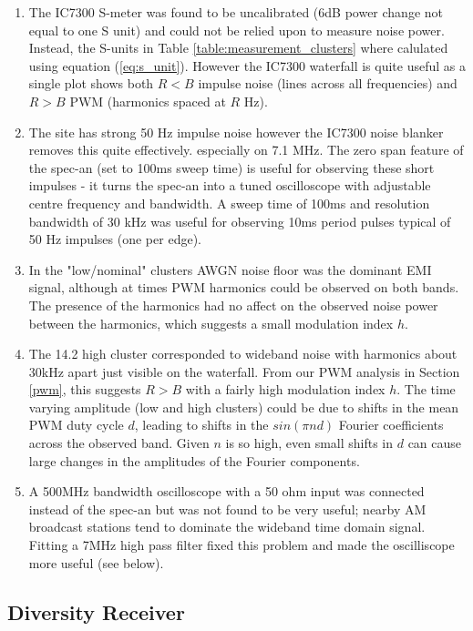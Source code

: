 \documentclass{article}
\begin{document}
\begin{enumerate}
\item The IC7300 S-meter was found to be uncalibrated \cite{vu2nsb_s_meter} (6dB power change not equal to one S unit) and could not be relied upon to measure noise power.  Instead, the S-units in Table \ref{table:measurement_clusters} where calulated using equation (\ref{eq:s_unit}). However the IC7300 waterfall is quite useful as a single plot shows both $R<B$ impulse noise (lines across all frequencies) and $R>B$ PWM (harmonics spaced at $R$ Hz).
\item The site has strong 50 Hz impulse noise however the IC7300 noise blanker removes this quite effectively. especially on 7.1 MHz.  The zero span feature of the spec-an (set to 100ms sweep time) is useful for observing these short impulses - it turns the spec-an into a tuned oscilloscope with adjustable centre frequency and bandwidth.  A sweep time of 100ms and resolution bandwidth of 30 kHz was useful for observing 10ms period pulses typical of 50 Hz impulses (one per edge).
\item In the "low/nominal" clusters AWGN noise floor was the dominant EMI signal, although at times PWM harmonics could be observed on both bands. The presence of the harmonics had no affect on the observed noise power between the harmonics, which suggests a small modulation index $h$.
\item The 14.2 high cluster corresponded to wideband noise with harmonics about 30kHz apart just visible on the waterfall.  From our PWM analysis in Section \ref{pwm}, this suggests $R>B$ with a fairly high modulation index $h$.  The time varying amplitude (low and high clusters) could be due to shifts in the mean PWM duty cycle $d$, leading to shifts in the $sin(\pi n d)$ Fourier coefficients across the observed band.  Given $n$ is so high, even small shifts in $d$ can cause large changes in the amplitudes of the Fourier components.
\item A 500MHz bandwidth oscilloscope with a 50 ohm input was connected instead of the spec-an but was not found to be very useful; nearby AM broadcast stations tend to dominate the wideband time domain signal.  Fitting a 7MHz high pass filter fixed this problem and made the oscilliscope more useful (see below). 
\end{enumerate}

\subsection{Diversity Receiver}
\end{document}

